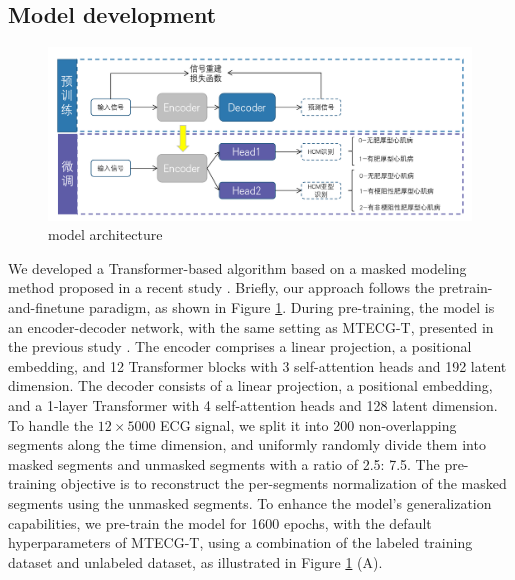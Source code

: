 \documentclass[11pt]{article}
\theoremstyle{definition}
\begin{document}




\subsection*{Model development}

\begin{figure}[!hbt]
	\centering
	\includegraphics[width = 150 mm %
	]{./model_achi}
	\caption{model architecture
		\label{model_achi} }
\end{figure}

We developed a Transformer-based algorithm based on a masked modeling method proposed in a recent study \citep{zhou2023masked}. Briefly, our approach follows the pretrain-and-finetune paradigm, as shown in Figure \ref{model_achi}. During pre-training, the model is an encoder-decoder network, with the same setting as MTECG-T, presented in the previous study \citep{zhou2023masked}. The encoder comprises a linear projection, a positional embedding, and 12 Transformer blocks with 3 self-attention heads and 192 latent dimension. The decoder consists of a linear projection, a positional embedding, and a 1-layer Transformer with 4 self-attention heads and 128 latent dimension. To handle the $12 \times 5000$ ECG signal, we split it into 200 non-overlapping segments along the time dimension, and uniformly randomly divide them into masked segments and unmasked segments with a ratio of 2.5: 7.5. The pre-training objective is to reconstruct the per-segments normalization of the masked segments using the unmasked segments. To enhance the model's generalization capabilities, we pre-train the model for 1600 epochs, with the default hyperparameters of MTECG-T, using a combination of the labeled training dataset and unlabeled dataset, as illustrated in Figure \ref{model_achi} (A).
\end{document}
